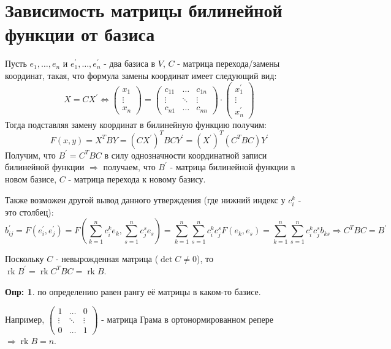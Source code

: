 \documentclass[12pt]{article}
\theoremstyle{definition}
\newtheorem{defn}{Опр:}
\DeclareMathOperator{\rk}{rk}
\begin{document}
\section*{Зависимость матрицы билинейной функции от базиса}
Пусть $e_1, \dotsc, e_n$ и $e_1^\prime, \dotsc, e_n^\prime$ - два базиса в $V$, $C$ - матрица перехода/замены координат, такая, что формула замены координат имеет следующий вид:
$$
	X = CX^\prime \Leftrightarrow 
	\begin{pmatrix}
		x_1 \\
		\vdots \\
		x_n
	\end{pmatrix} = 
	\begin{pmatrix}
		c_{11} & \dotsc & c_{1n}\\
		\vdots & \ddots & \vdots \\
		c_{n1} & \dotsc & c_{nn}
	\end{pmatrix}{\cdot}
	\begin{pmatrix}
		x_1^\prime\\
		\vdots \\
		x_n^\prime
	\end{pmatrix}
$$
Тогда подставляя замену координат в билинейную функцию получим:
$$
	F(x,y) = X^T B Y = (CX^\prime)^TBCY^\prime = (X^\prime)^T (C^T B C)Y^\prime 
$$
Получим, что $B^\prime = C^T B C$ в силу однозначности координатной записи билинейной функции $\Rightarrow$ получаем, что $B^\prime$ - матрица билинейной функции  в новом базисе, $C$ - матрица перехода к новому базису.

Также возможен другой вывод данного утверждения (где нижний индекс у $c_i^k$ - это столбец):
$$
	b_{ij}^\prime = F(e_i^\prime, e_j^\prime) = F\left(\sum\limits_{k = 1}^n c_i^k e_k, \sum\limits_{s = 1}^n c_j^s e_s\right) = \sum\limits_{k = 1 }^n \sum\limits_{s = 1}^n c_i^k c_j^s F(e_k, e_s) = \sum\limits_{k = 1 }^n \sum\limits_{s = 1}^n c_i^k c_j^s b_{ks} \Rightarrow C^T B C = B^\prime
$$

Поскольку $C$ - невырожденная матрица ($\det{C} \neq 0$), то $\rk{B^\prime} = \rk{C^T B C} = \rk{B}$.
\begin{defn}
	 по определению равен рангу её матрицы в каком-то базисе.
\end{defn}
Например, $\begin{pmatrix}
	1 & \dotsc & 0 \\
	\vdots & \ddots & \vdots \\
	0 & \dotsc & 1
\end{pmatrix}$ - матрица Грама в ортонормированном репере $\Rightarrow \rk{B} = n$.
\end{document}
